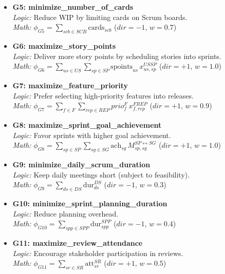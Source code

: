 \documentclass[11pt,a4paper]{article}
\begin{document}
\begin{itemize}[leftmargin=2.2em]
  \item \textbf{G5: minimize\_number\_of\_cards} \\
  \emph{Logic:} Reduce WIP by limiting cards on Scrum boards. \\
  \emph{Math:} $\displaystyle \phi_{G5}=\sum_{scb\in SCB}\mathrm{cards}_{scb}$ \quad ($dir=-1$, $w=0.7$)

  \item \textbf{G6: maximize\_story\_points} \\
  \emph{Logic:} Deliver more story points by scheduling stories into sprints. \\
  \emph{Math:} $\displaystyle \phi_{G6}=\sum_{us\in US}\sum_{sp\in SP}\mathrm{spoints}_{us}\, x^{USSP}_{us,sp}$ \quad ($dir=+1$, $w=1.0$)

  \item \textbf{G7: maximize\_feature\_priority} \\
  \emph{Logic:} Prefer selecting high-priority features into releases. \\
  \emph{Math:} $\displaystyle \phi_{G7}=\sum_{f\in F}\sum_{rep\in REP} prio^{F}_{f}\, x^{FREP}_{f,rep}$ \quad ($dir=+1$, $w=0.9$)

  \item \textbf{G8: maximize\_sprint\_goal\_achievement} \\
  \emph{Logic:} Favor sprints with higher goal achievement. \\
  \emph{Math:} $\displaystyle \phi_{G8}=\sum_{sp\in SP}\sum_{sg\in SG} \mathrm{ach}_{sg}\, M^{SP\leftrightarrow SG}_{sp,sg}$ \quad ($dir=+1$, $w=1.0$)

  \item \textbf{G9: minimize\_daily\_scrum\_duration} \\
  \emph{Logic:} Keep daily meetings short (subject to feasibility). \\
  \emph{Math:} $\displaystyle \phi_{G9}=\sum_{ds\in DS}\mathrm{dur}^{DS}_{ds}$ \quad ($dir=-1$, $w=0.3$)

  \item \textbf{G10: minimize\_sprint\_planning\_duration} \\
  \emph{Logic:} Reduce planning overhead. \\
  \emph{Math:} $\displaystyle \phi_{G10}=\sum_{spp\in SPP}\mathrm{dur}^{SPP}_{spp}$ \quad ($dir=-1$, $w=0.4$)

  \item \textbf{G11: maximize\_review\_attendance} \\
  \emph{Logic:} Encourage stakeholder participation in reviews. \\
  \emph{Math:} $\displaystyle \phi_{G11}=\sum_{sr\in SR}\mathrm{att}^{SR}_{sr}$ \quad ($dir=+1$, $w=0.5$)
\end{itemize}
\end{document}
